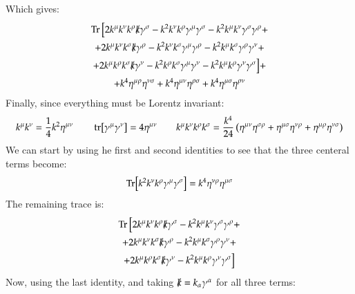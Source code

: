 \documentclass{article}
\begin{document}
Which gives:
\begin{equation}
\begin{gathered}
    \Tr \Big[
    2k^\mu k^\nu k^\rho \slashed{k}\gamma^\sigma -
    k^2 k^\nu k^\rho \gamma^\mu \gamma^\sigma -
    k^2 k^\mu k^\nu\gamma^\sigma\gamma^\rho + \\ +
    2k^\mu k^\nu k^\sigma \slashed{k}\gamma^\rho -
    k^2 k^\nu k^\sigma \gamma^\mu \gamma^\rho -
    k^2 k^\mu k^\sigma \gamma^\rho\gamma^\nu + \\ +
    2k^\mu k^\rho k^\sigma \slashed{k}\gamma^\nu -
    k^2 k^\rho k^\sigma \gamma^\mu \gamma^\nu -
    k^2 k^\mu k^\rho \gamma^\nu\gamma^\sigma\Big] + \\ +
    k^4\eta^{\mu\rho}\eta^{\nu\sigma} + 
    k^4\eta^{\mu\nu}\eta^{\rho\sigma} + 
    k^4\eta^{\mu\sigma}\eta^{\rho\nu}
\end{gathered}
\end{equation}
Finally, since everything must be Lorentz invariant:
\begin{equation}
    k^\mu k^\nu = \frac{1}{4} k^2 \eta^{\mu\nu}
    \qquad
    \tr[\gamma^\mu\gamma^\nu] = 4\eta^{\mu\nu}
    \qquad
    k^\mu k^\nu k^\rho k^\sigma = \frac{k^4}{24}\left(
        \eta^{\mu\nu}\eta^{\sigma\rho} +
        \eta^{\mu\sigma}\eta^{\nu\rho} +
        \eta^{\mu\rho}\eta^{\nu\sigma}
    \right)
\end{equation}
We can start by using he first and second identities to see that the three centeral terms become:
\begin{equation}
    \Tr[k^2 k^\nu k^\rho \gamma^\mu \gamma^\sigma] = k^4 \eta^{\nu\rho}\eta^{\mu\sigma} 
\end{equation}
The remaining trace is:
\begin{equation}
\begin{gathered}
    \Tr \Big[
    2k^\mu k^\nu k^\rho \slashed{k}\gamma^\sigma -
    k^2 k^\mu k^\nu\gamma^\sigma\gamma^\rho + \\ +
    2k^\mu k^\nu k^\sigma \slashed{k}\gamma^\rho -
    k^2 k^\mu k^\sigma \gamma^\rho\gamma^\nu + \\ +
    2k^\mu k^\rho k^\sigma \slashed{k}\gamma^\nu -
    k^2 k^\mu k^\rho \gamma^\nu\gamma^\sigma\Big]
\end{gathered}
\end{equation}
Now, using the last identity, and taking $\slashed{k} = k_\alpha\gamma^\alpha$ for all three terms:
\end{document}
